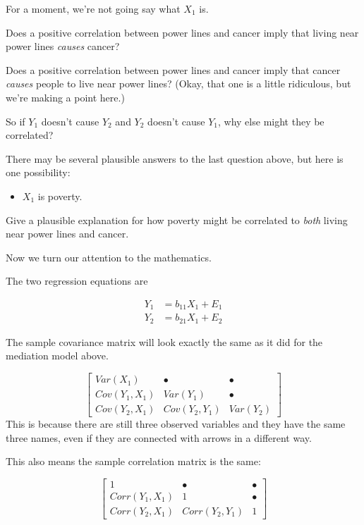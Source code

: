 \documentclass[
]{book}
\providecommand{\tightlist}{%
  \setlength{\itemsep}{0pt}\setlength{\parskip}{0pt}}
\begin{document}
For a moment, we're not going say what \(X_{1}\) is.

Does a positive correlation between power lines and cancer imply that living near power lines \emph{causes} cancer?

Does a positive correlation between power lines and cancer imply that cancer \emph{causes} people to live near power lines? (Okay, that one is a little ridiculous, but we're making a point here.)

So if \(Y_{1}\) doesn't cause \(Y_{2}\) and \(Y_{2}\) doesn't cause \(Y_{1}\), why else might they be correlated?

There may be several plausible answers to the last question above, but here is one possibility:

\begin{itemize}
\tightlist
\item
  \(X_{1}\) is poverty.
\end{itemize}

Give a plausible explanation for how poverty might be correlated to \emph{both} living near power lines and cancer.

Now we turn our attention to the mathematics.

The two regression equations are

\begin{align}
Y_{1} &= b_{11}X_{1} + E_{1}        \\
Y_{2} &= b_{21}X_{1} + E_{2}
\end{align}

The sample covariance matrix will look exactly the same as it did for the mediation model above.

\[
\begin{bmatrix}
Var(X_{1})          &   \bullet             &   \bullet \\
Cov(Y_{1}, X_{1})   &   Var(Y_{1})          &   \bullet \\
Cov(Y_{2}, X_{1})   &   Cov(Y_{2}, Y_{1})   &   Var(Y_{2})
\end{bmatrix}
\]
This is because there are still three observed variables and they have the same three names, even if they are connected with arrows in a different way.

This also means the sample correlation matrix is the same:

\[
\begin{bmatrix}
1                   &   \bullet             &   \bullet \\
Corr(Y_{1}, X_{1})  &   1                   &   \bullet \\
Corr(Y_{2}, X_{1})  &   Corr(Y_{2}, Y_{1})   &   1
\end{bmatrix}
\]
\end{document}
